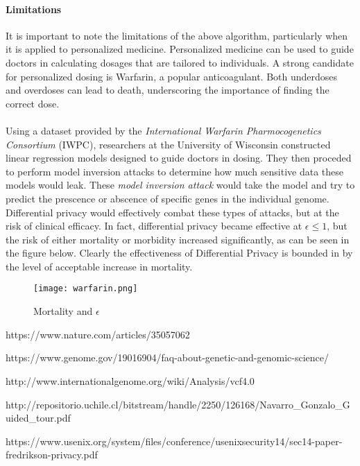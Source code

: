 \paragraph{Limitations}

It is important to note the limitations of the above algorithm, particularly when it is applied to personalized medicine. Personalized medicine can be used to guide doctors in calculating dosages that are tailored to individuals. A strong candidate for personalized dosing is Warfarin, a popular anticoagulant. Both underdoses and overdoses can lead to death, underscoring the importance of finding the correct dose.

\paragraph{}
Using a dataset provided by the \textit{International Warfarin Pharmocogenetics Consortium} (IWPC), researchers at the University of Wisconsin constructed linear regression models designed to guide doctors in dosing. They then proceded to perform model inversion attacks to determine how much sensitive data these models would leak. These \textit{model inversion attack} would take the model and try to predict the prescence or abscence of specific genes in the individual genome. Differential privacy would effectively combat these types of attacks, but at the risk of clinical efficacy. In fact, differential privacy became effective at $\epsilon \leq 1$, but the risk of either mortality or morbidity increased significantly, as can be seen in the figure below. Clearly the effectiveness of Differential Privacy is bounded in by the level of acceptable increase in mortality. 

\begin{figure}[h]
\texttt{[image: warfarin.png]}
\centering
\caption{Mortality and $\epsilon$}
\end{figure}

\begin{thebibliography}{5}
  
  https://www.nature.com/articles/35057062

  https://www.genome.gov/19016904/faq-about-genetic-and-genomic-science/

  http://www.internationalgenome.org/wiki/Analysis/vcf4.0
  
  http://repositorio.uchile.cl/bitstream\-/handle/2250/126168/Navarro\_Gonzalo\-\_Guided\_tour.pdf

  https://www.usenix.org/system/files/conference/usenixsecurity14/sec14-paper-fredrikson-privacy.pdf

\end{thebibliography}
